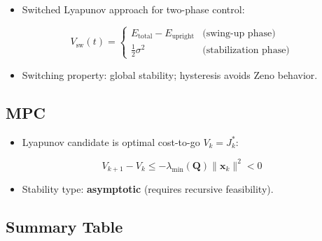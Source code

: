 \documentclass[10pt, a4paper]{article}
\newcommand{\vx}{\boldsymbol{x}}
\begin{document}
\begin{itemize}[leftmargin=1.5em,itemsep=0.2em]
  \item Switched Lyapunov approach for two-phase control:
\end{itemize}
\begin{equation}
  V_\text{sw}(t) = \begin{cases}
    E_\text{total} - E_\text{upright} & \text{(swing-up phase)} \\
    \tfrac{1}{2}\sigma^2              & \text{(stabilization phase)}
  \end{cases}
\end{equation}
\begin{itemize}[leftmargin=1.5em,itemsep=0.2em]
  \item Switching property: global stability; hysteresis avoids Zeno behavior.
\end{itemize}

\subsection{MPC}

\begin{itemize}[leftmargin=1.5em,itemsep=0.2em]
  \item Lyapunov candidate is optimal cost-to-go $V_k=J_k^\ast$:
\end{itemize}
\begin{equation}
  V_{k+1} - V_k \leq -\lambda_\text{min}(\mathbf{Q})\|\vx_k\|^2 < 0
\end{equation}
\begin{itemize}[leftmargin=1.5em,itemsep=0.2em]
  \item Stability type: \textbf{asymptotic} (requires recursive feasibility).
\end{itemize}

\subsection{Summary Table}
\end{document}

